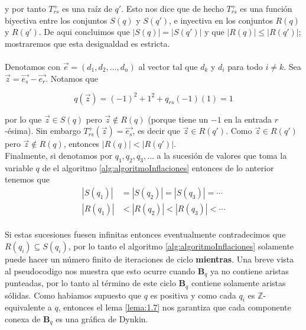 y por tanto $T_{rs}^{+}$ es una raíz de $q'$. Esto nos dice que de hecho $T_{rs}^{+}$ es una función biyectiva entre los conjuntos $S\left(q\right)$ y $S\left(q'\right)$, e inyectiva en los conjuntos $R\left(q\right)$ y $R\left(q'\right)$. De aqui concluimos que $\left|S\left(q\right)\right| =  \left|S\left(q'\right)\right|$ y que $\left|R\left(q\right)\right| \leq \left|R\left(q'\right)\right|$; mostraremos que esta desigualdad es estricta.

\paragraph{}
Denotamos con $\overrightarrow{e} = \left(d_{1}, d_{2},\dots,d_{n}\right)$ al vector tal que $d_{k}$ y $d_{i}$ para todo $i \neq k$. Sea $\overrightarrow{z} = \overrightarrow{e_{s}} - \overrightarrow{e_{r}} $. Notamos que 

\begin{equation*}
q\left(\overrightarrow{z}\right) = \left(-1\right)^{2} + 1^{2} + q_{rs}(-1)(1) = 1
\end{equation*}

por lo que $\overrightarrow{z} \in S\left(q\right)$ pero $\overrightarrow{z} \notin R\left(q\right)$ (porque tiene un $-1$ en la entrada $r$-ésima). Sin embargo $T_{rs}^{+}\left(\overrightarrow{z}\right) = \overrightarrow{e_{s}}$, es decir que $\overrightarrow{z} \in R\left(q'\right)$. Como $\overrightarrow{z} \in R\left(q'\right)$ pero $\overrightarrow{z} \notin R\left(q\right)$, entonces $\left|R\left(q\right)\right| < \left|R\left(q'\right)\right|$.\\

Finalmente, si denotamos por $q_{1}, q_{2},q_{3},\ldots$ a la sucesión de valores que toma la variable $q$ de el algoritmo \ref{alg:algoritmoInflaciones} entonces de lo anterior tenemos que\\

\begin{equation*}
\begin{split}
\left|S(q_{1})\right| & = \left|S(q_{2})\right| = \left|S(q_{3})\right| = \cdots\\
\left|R(q_{1})\right| & < \left|R\left(q_{2}\right)\right| < \left|R\left(q_{3}\right)\right| < \cdots 
\end{split}
\end{equation*}\\

Si estas sucesiones fuesen infinitas entonces eventualmente contradecimos que $R\left(q_{i}\right) \subseteq S\left(q_{i}\right)$, por lo tanto el algoritmo \ref{alg:algoritmoInflaciones} solamente puede hacer un número finito de iteraciones de ciclo \textbf{mientras}. Una breve vista al pseudocodigo nos muestra que esto ocurre cuando $\textbf{B}_{q}$ ya no contiene aristas punteadas, por lo tanto al término de este ciclo $\textbf{B}_{q}$ contiene solamente aristas sólidas. Como habiamos supuesto que $q$ es positiva y como cada $q_{i}$ es $\mathbb{Z}$-equivalente a $q$, entonces el lema \ref{lema:1.7} nos garantiza que cada componente conexa de $\textbf{B}_{q}$ es una gráfica de Dynkin.\\

